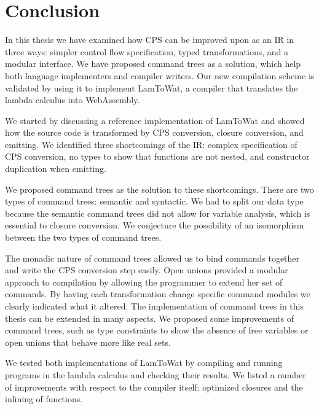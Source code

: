 
\chapter{\label{chap:conclusion}Conclusion}

In this thesis we have examined how CPS can be improved upon as an IR in three ways: simpler control flow specification, typed transformations, and a modular interface. We have proposed command trees as a solution, which help both language implementers and compiler writers. Our new compilation scheme is validated by using it to implement LamToWat, a compiler that translates the lambda calculus into WebAssembly.

We started by discussing a reference implementation of LamToWat and showed how the source code is transformed by CPS conversion, closure conversion, and emitting. We identified three shortcomings of the IR: complex specification of CPS conversion, no types to show that functions are not nested, and constructor duplication when emitting.

We proposed command trees as the solution to these shortcomings. There are two types of command trees: semantic and syntactic. We had to split our data type because the semantic command trees did not allow for variable analysis, which is essential to closure conversion. We conjecture the possibility of an isomorphism between the two types of command trees.

The monadic nature of command trees allowed us to bind commands together and write the CPS conversion step easily. Open unions provided a modular approach to compilation by allowing the programmer to extend her set of commands. By having each transformation change specific command modules we clearly indicated what it altered. The implementation of command trees in this thesis can be extended in many aspects. We proposed some improvements of command trees, such as type constraints to show the absence of free variables or open unions that behave more like real sets.

We tested both implementations of LamToWat by compiling and running programs in the lambda calculus and checking their results. We listed a number of improvements with respect to the compiler itself: optimized closures and the inlining of functions.